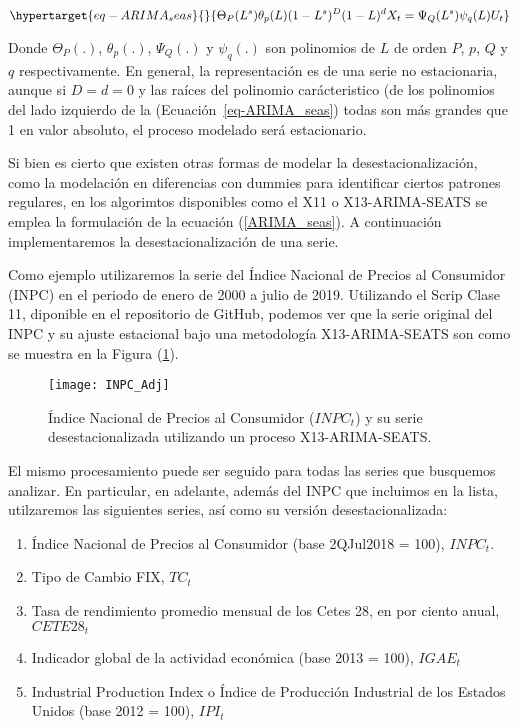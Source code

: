 \documentclass[
  a4paper,
]{article}
\providecommand{\tightlist}{%
  \setlength{\itemsep}{0pt}\setlength{\parskip}{0pt}}\usepackage{longtable,booktabs,array}
\begin{document}
\begin{equation}\protect\hypertarget{eq-ARIMA_seas}{}{
\Theta_P(L^s) \theta_p(L) (1 - L^s)^D (1 - L)^d X_t = \Psi_Q(L^s) \psi_q(L) U_t
}\label{eq-ARIMA_seas}\end{equation}

Donde \(\Theta_P(.)\), \(\theta_p(.)\), \(\Psi_Q(.)\) y \(\psi_q(.)\)
son polinomios de \(L\) de orden \(P\), \(p\), \(Q\) y \(q\)
respectivamente. En general, la representación es de una serie no
estacionaria, aunque si \(D = d = 0\) y las raíces del polinomio
carácteristico (de los polinomios del lado izquierdo de la
(Ecuación~\ref{eq-ARIMA_seas}) todas son más grandes que 1 en valor
absoluto, el proceso modelado será estacionario.

Si bien es cierto que existen otras formas de modelar la
desestacionalización, como la modelación en diferencias con dummies para
identificar ciertos patrones regulares, en los algorimtos disponibles
como el X11 o X13-ARIMA-SEATS se emplea la formulación de la ecuación
(\ref{ARIMA_seas}). A continuación implementaremos la
desestacionalización de una serie.

Como ejemplo utilizaremos la serie del Índice Nacional de Precios al
Consumidor (INPC) en el periodo de enero de 2000 a julio de 2019.
Utilizando el Scrip Clase 11, diponible en el repositorio de GitHub,
podemos ver que la serie original del INPC y su ajuste estacional bajo
una metodología X13-ARIMA-SEATS son como se muestra en la Figura
(\ref{INPC_Adj}).

\begin{figure}
  \centering
    \texttt{[image: INPC\_Adj]}
  \caption{Índice Nacional de Precios al Consumidor ($INPC_t$) y su serie desestacionalizada utilizando un proceso X13-ARIMA-SEATS.}
  \label{INPC_Adj}
\end{figure}

El mismo procesamiento puede ser seguido para todas las series que
busquemos analizar. En particular, en adelante, además del INPC que
incluimos en la lista, utilzaremos las siguientes series, así como su
versión desestacionalizada:

\begin{enumerate}
\def\labelenumi{\arabic{enumi}.}
\tightlist
\item
  Índice Nacional de Precios al Consumidor (base 2QJul2018 = 100),
  \(INPC_t\).
\item
  Tipo de Cambio FIX, \(TC_t\)
\item
  Tasa de rendimiento promedio mensual de los Cetes 28, en por ciento
  anual, \(CETE28_t\)
\item
  Indicador global de la actividad económica (base 2013 = 100),
  \(IGAE_t\)
\item
  Industrial Production Index o Índice de Producción Industrial de los
  Estados Unidos (base 2012 = 100), \(IPI_t\)
\end{enumerate}
\end{document}
